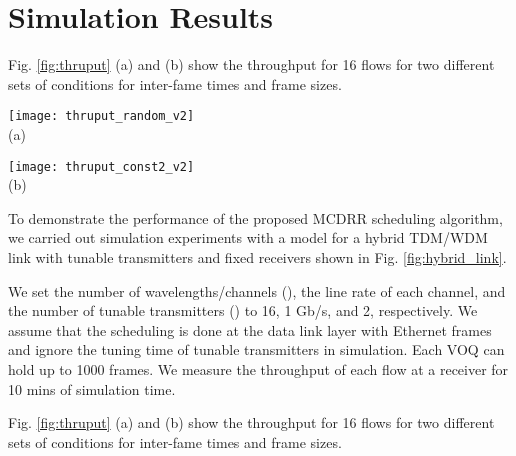 \documentclass[conference,letterpaper]{IEEEtran}
\begin{document}
\section{Simulation Results}

Fig. \ref{fig:thruput} (a) and (b) show the throughput for 16 flows for two
different sets of conditions for inter-fame times and frame sizes.





\begin{figure*}[hbtp]
  \begin{minipage}{.48\linewidth}
    \begin{center}
     \texttt{[image: thruput\_random\_v2]}\\
      {\scriptsize (a)}
    \end{center}
  \end{minipage}
  \hfill
  \begin{minipage}{.48\linewidth}
    \begin{center}
      \texttt{[image: thruput\_const2\_v2]}\\
      {\scriptsize (b)}
    \end{center}
  \end{minipage}
  \caption{Throughput for 16 flows with (a) exponential interframe times and
    random frame sizes and (b) exponential interframe times and fixed frame
    sizes.}
  \label{fig:thruput}
\end{figure*}
To demonstrate the performance of the proposed MCDRR scheduling algorithm, we
carried out simulation experiments with a model for a hybrid TDM/WDM link with
tunable transmitters and fixed receivers shown in Fig. \ref{fig:hybrid_link}.

We set the number of wavelengths/channels (), the line rate of each channel,
and the number of tunable transmitters () to 16, 1 Gb/s, and 2,
respectively. We assume that the scheduling is done at the data link layer with
Ethernet frames and ignore the tuning time of tunable transmitters in
simulation. Each VOQ can hold up to 1000 frames. We measure the throughput of
each flow at a receiver for 10 mins of simulation time.

Fig. \ref{fig:thruput} (a) and (b) show the throughput for 16 flows for two
different sets of conditions for inter-fame times and frame sizes.
\end{document}
